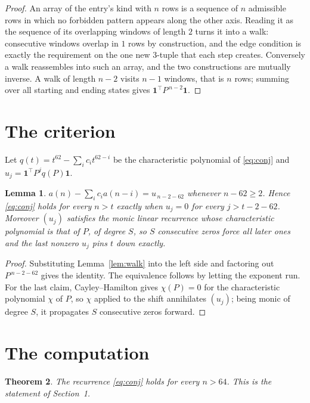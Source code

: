 \documentclass[11pt,a4paper]{article}
\theoremstyle{plain}
\newtheorem{theorem}{Theorem}
\newtheorem{lemma}[theorem]{Lemma}
\theoremstyle{definition}
\begin{document}
\begin{proof}
An array of the entry's kind with $n$ rows is a sequence of $n$ admissible rows in
which no forbidden pattern appears along the other axis. Reading it as the sequence of its
overlapping windows of length $2$ turns it into a walk: consecutive windows overlap in
$1$ rows by construction, and the edge condition is exactly the requirement on the one
new $3$-tuple that each step creates. Conversely a walk reassembles into such an array,
and the two constructions are mutually inverse. A walk of length $n-2$ visits $n-1$
windows, that is $n$ rows; summing over all starting and ending states gives
$\mathbf{1}^{\!\top}P^{\,n-2}\mathbf{1}$.
\end{proof}

\section{The criterion}

Let $q(t)=t^{62}-\sum_i c_i t^{62-i}$ be the characteristic polynomial of
\eqref{eq:conj} and $u_j=\mathbf{1}^{\!\top}P^{j}q(P)\mathbf{1}$.

\begin{lemma}\label{lem:crit}
$a(n)-\sum_i c_i a(n-i)=u_{\,n-2-62}$ whenever $n-62\ge2$. Hence
\eqref{eq:conj} holds for every $n>t$ exactly when $u_j=0$ for every
$j>t-2-62$. Moreover $(u_j)$ satisfies the monic linear recurrence whose
characteristic polynomial is that of $P$, of degree $S$, so $S$ consecutive zeros force all
later ones and the last nonzero $u_j$ pins $t$ down exactly.
\end{lemma}

\begin{proof}
Substituting Lemma~\ref{lem:walk} into the left side and factoring out
$P^{\,n-2-62}$ gives the identity. The equivalence follows by letting the exponent
run. For the last claim, Cayley--Hamilton gives $\chi(P)=0$ for the characteristic
polynomial $\chi$ of $P$, so $\chi$ applied to the shift annihilates $(u_j)$; being monic of
degree $S$, it propagates $S$ consecutive zeros forward.
\end{proof}

\section{The computation}

\begin{theorem}
The recurrence \eqref{eq:conj} holds for every $n>64$. This is the statement of
Section~1.
\end{theorem}
\end{document}
